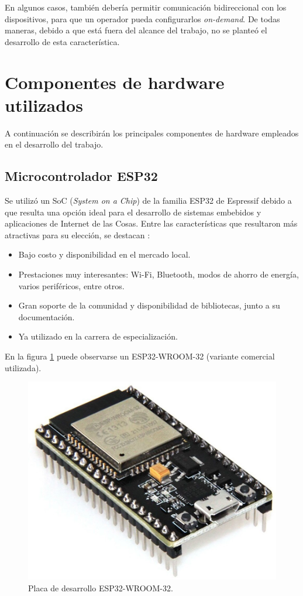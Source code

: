 En algunos casos, también debería permitir comunicación bidireccional con los dispositivos, para que un operador pueda configurarlos \textit{on-demand}. De todas maneras, debido a que está fuera del alcance del trabajo, no se planteó el desarrollo de esta característica.

\section{Componentes de hardware utilizados}

A continuación se describirán los principales componentes de hardware empleados en el desarrollo del trabajo.

\subsection{Microcontrolador ESP32}

Se utilizó un SoC (\textit{System on a Chip}) de la familia ESP32 de Espressif debido a que resulta una opción ideal para el desarrollo de sistemas embebidos y aplicaciones de Internet de las Cosas. Entre las características que resultaron más atractivas para su elección, se destacan \citep{ESP32:1}:
\begin{itemize}
	\item Bajo costo y disponibilidad en el mercado local.
	\item Prestaciones muy interesantes: Wi-Fi, Bluetooth, modos de ahorro de energía, varios periféricos, entre otros.
	\item Gran soporte de la comunidad y disponibilidad de bibliotecas, junto a su documentación.
	\item Ya utilizado en la carrera de especialización.
\end{itemize}

En la figura \ref{fig:esp32s} puede observarse un ESP32-WROOM-32 (variante comercial utilizada).

\begin{figure}[H]
	\centering
	\includegraphics[width=.6\textwidth]{./Figures/esp32s.png}
	\caption{Placa de desarrollo ESP32-WROOM-32.}
	\label{fig:esp32s}
\end{figure}

